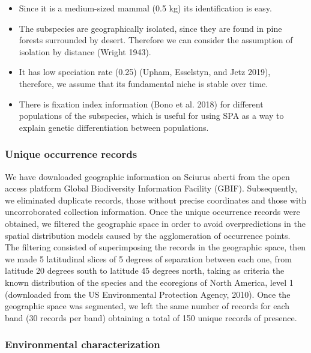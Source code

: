 \documentclass[
]{article}
\providecommand{\tightlist}{%
  \setlength{\itemsep}{0pt}\setlength{\parskip}{0pt}}
\begin{document}
\begin{itemize}
\tightlist
\item
  Since it is a medium-sized mammal (0.5 kg) its identification is easy.
\item
  The subspecies are geographically isolated, since they are found in
  pine forests surrounded by desert. Therefore we can consider the
  assumption of isolation by distance (Wright 1943).
\item
  It has low speciation rate (0.25) (Upham, Esselstyn, and Jetz 2019),
  therefore, we assume that its fundamental niche is stable over time.
\item
  There is fixation index information (Bono et al. 2018) for different
  populations of the subspecies, which is useful for using SPA as a way
  to explain genetic differentiation between populations.
\end{itemize}

\hypertarget{unique-occurrence-records}{%
\subsubsection{Unique occurrence
records}\label{unique-occurrence-records}}

We have downloaded geographic information on Sciurus aberti from the
open access platform Global Biodiversity Information Facility (GBIF).
Subsequently, we eliminated duplicate records, those without precise
coordinates and those with uncorroborated collection information. Once
the unique occurrence records were obtained, we filtered the geographic
space in order to avoid overpredictions in the spatial distribution
models caused by the agglomeration of occurrence points. The filtering
consisted of superimposing the records in the geographic space, then we
made 5 latitudinal slices of 5 degrees of separation between each one,
from latitude 20 degrees south to latitude 45 degrees north, taking as
criteria the known distribution of the species and the ecoregions of
North America, level 1 (downloaded from the US Environmental Protection
Agency, 2010). Once the geographic space was segmented, we left the same
number of records for each band (30 records per band) obtaining a total
of 150 unique records of presence.

\hypertarget{environmental-characterization}{%
\subsubsection{Environmental
characterization}\label{environmental-characterization}}
\end{document}
